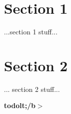 \hypertarget{index_sec_1}{}\section{Section 1}\label{index_sec_1}
...section 1 stuff... \hypertarget{index_sec_2}{}\section{Section 2}\label{index_sec_2}
... section 2 stuff...



 {\bfseries{todolt;/b$>$ }}